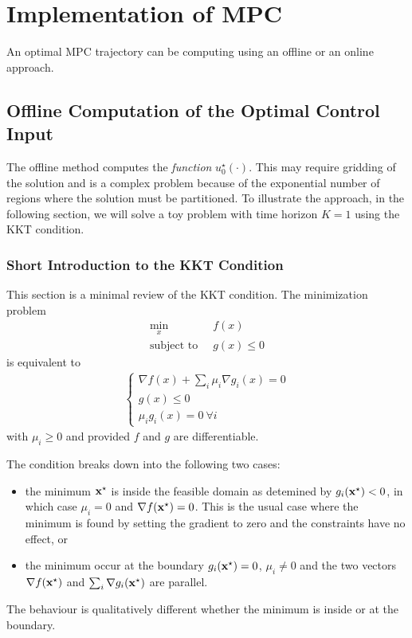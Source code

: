 \section{Implementation of MPC}
\label{sec:implementation-MPC}

An optimal MPC trajectory can be computing using an offline or an online approach.

\subsection{Offline Computation of the Optimal Control Input}
\label{sec:offline-computation-MPC}

The offline method computes the \emph{function} $u_0^\star(\cdot)$. This may require gridding of the solution and is a complex problem because of the exponential number of regions where the solution must be partitioned. To illustrate the approach, in the following section, we will solve a toy problem with time horizon $K=1$ using the KKT condition.

\subsubsection{Short Introduction to the KKT Condition}
\label{sec:short-intro-KKT}

This section is a minimal review of the KKT condition. The minimization problem
\begin{align*}
  \min_x &\ f(x) \\
  \text{subject to } &\ g(x) \le 0
\end{align*}
is equivalent to
\begin{align*}
  \begin{cases}
    \nabla f(x) + \sum_i \mu_i \nabla g_i(x) = 0 \\
    g(x) \le 0 \\
    \mu_i g_i(x) = 0\ \forall i
  \end{cases}
\end{align*}
with $\mu_i\ge 0$ and provided $f$ and $g$ are differentiable.

The condition breaks down into the following two cases:
\begin{itemize}
\item the minimum $\boldsymbol{\mathrm{x}}^\star$ is inside the feasible domain as   detemined by $g_i(\boldsymbol{\mathrm{x}}^\star) < 0$, in which case $\mu_i=0$ and   $\nabla f(\boldsymbol{\mathrm{x}}^\star) = 0$. This is the usual case where the minimum   is found by setting the gradient to zero and the constraints have no   effect, or
\item the minimum occur at the boundary $g_i(\boldsymbol{\mathrm{x}}^\star) = 0$,   $\mu_i\neq 0$ and the two vectors $\nabla f(\boldsymbol{\mathrm{x}}^\star)$ and   $\sum_i \nabla g_i(\boldsymbol{\mathrm{x}}^\star)$ are parallel.
\end{itemize}
The behaviour is qualitatively different whether the minimum is inside or at the boundary.


